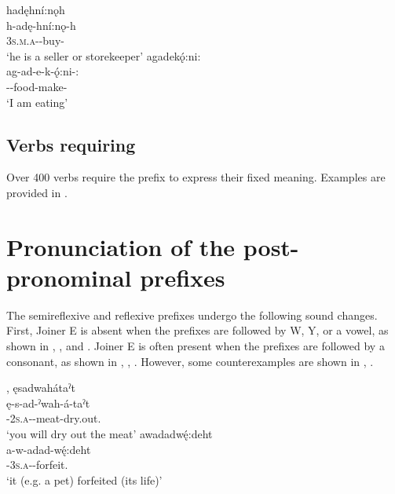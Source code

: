 \ea\label{ex:rflsrfex13}
\ea hadęhní:nǫh\\
\gll h-adę-hní:nǫ-h\\
 \textsc{3s.m.a}-{\semireflexive}-buy-{\habitual}\\
\glt `he is a seller or storekeeper'
\ex agadekǫ́:ni:\\
\gll ag-ad-e-k-ǫ́:ni-:\\
 -{\joinerE}-food-make-{\stative}\\
\glt `I am eating'
\z
\z

\subsection{Verbs requiring  {\semireflexive}} \label{Verbs that require the [ad-] (semireflexive) prefix}
Over 400 verbs require the  {\semireflexive} prefix to express their fixed meaning. Examples are provided in .


\section{Pronunciation of the post-pronominal prefixes} \label{Pronunciation of the post-pronominal prefixes}
The semireflexive and reflexive prefixes undergo the following sound changes. First, Joiner E is absent when the prefixes are followed by W, Y, or a vowel, as shown in , , and . Joiner E is often present when the prefixes are followed by a consonant, as shown in , , . However, some counterexamples are shown in , . 

\ea\label{ex:semireflpronex}  {\semireflexive},  {}
\ea ęsadwahátaˀt\\\label{ex:semireflpronexa}
\gll ę-s-ad-ˀwah-á-taˀt\\
 \fut-\textsc{2s.a}-{\semireflexive}-meat-dry.out.{\zeropunctual}\\
\glt `you will dry out the meat'
\ex awadadwę́:deht\\\label{ex:semireflpronexb}
\gll a-w-adad-wę́:deht\\
 {\factual}-\textsc{3s.a}-{}-forfeit.{\zeropunctual}\\
\glt `it (e.g. a pet) forfeited (its life)'
\z
\z


